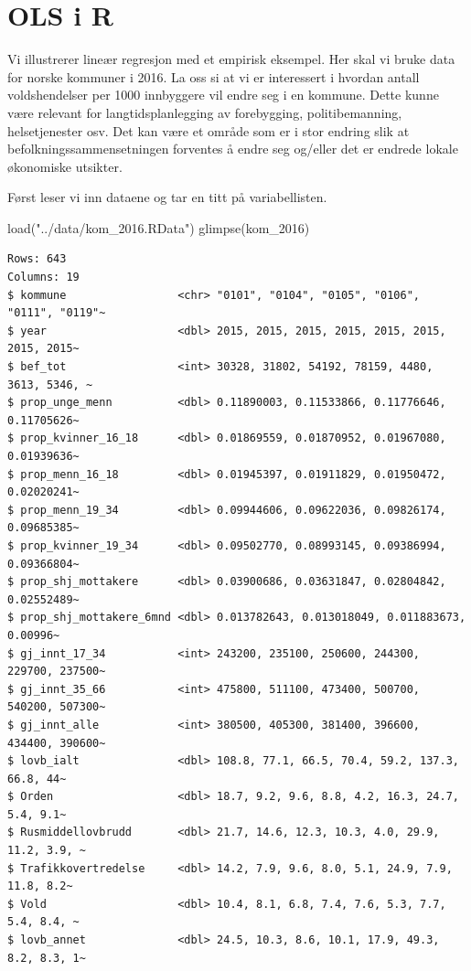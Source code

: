 \documentclass[
  letterpaper,
  DIV=11,
  numbers=noendperiod]{scrreprt}
\newenvironment{Shaded}{\begin{snugshade}}{\end{snugshade}}
\newcommand{\FunctionTok}[1]{\textcolor[rgb]{0.28,0.35,0.67}{#1}}
\newcommand{\NormalTok}[1]{\textcolor[rgb]{0.00,0.23,0.31}{#1}}
\newcommand{\StringTok}[1]{\textcolor[rgb]{0.13,0.47,0.30}{#1}}
\theoremstyle{definition}
\theoremstyle{remark}
\begin{document}
\hypertarget{ols-i-r}{%
\section{OLS i R}\label{ols-i-r}}

Vi illustrerer lineær regresjon med et empirisk eksempel. Her skal vi
bruke data for norske kommuner i 2016. La oss si at vi er interessert i
hvordan antall voldshendelser per 1000 innbyggere vil endre seg i en
kommune. Dette kunne være relevant for langtidsplanlegging av
forebygging, politibemanning, helsetjenester osv. Det kan være et område
som er i stor endring slik at befolkningssammensetningen forventes å
endre seg og/eller det er endrede lokale økonomiske utsikter.

Først leser vi inn dataene og tar en titt på variabellisten.

\begin{Shaded}
\begin{Highlighting}[]
\FunctionTok{load}\NormalTok{(}\StringTok{"../data/kom\_2016.RData"}\NormalTok{)}
\FunctionTok{glimpse}\NormalTok{(kom\_2016)}
\end{Highlighting}
\end{Shaded}

\begin{verbatim}
Rows: 643
Columns: 19
$ kommune                 <chr> "0101", "0104", "0105", "0106", "0111", "0119"~
$ year                    <dbl> 2015, 2015, 2015, 2015, 2015, 2015, 2015, 2015~
$ bef_tot                 <int> 30328, 31802, 54192, 78159, 4480, 3613, 5346, ~
$ prop_unge_menn          <dbl> 0.11890003, 0.11533866, 0.11776646, 0.11705626~
$ prop_kvinner_16_18      <dbl> 0.01869559, 0.01870952, 0.01967080, 0.01939636~
$ prop_menn_16_18         <dbl> 0.01945397, 0.01911829, 0.01950472, 0.02020241~
$ prop_menn_19_34         <dbl> 0.09944606, 0.09622036, 0.09826174, 0.09685385~
$ prop_kvinner_19_34      <dbl> 0.09502770, 0.08993145, 0.09386994, 0.09366804~
$ prop_shj_mottakere      <dbl> 0.03900686, 0.03631847, 0.02804842, 0.02552489~
$ prop_shj_mottakere_6mnd <dbl> 0.013782643, 0.013018049, 0.011883673, 0.00996~
$ gj_innt_17_34           <int> 243200, 235100, 250600, 244300, 229700, 237500~
$ gj_innt_35_66           <int> 475800, 511100, 473400, 500700, 540200, 507300~
$ gj_innt_alle            <int> 380500, 405300, 381400, 396600, 434400, 390600~
$ lovb_ialt               <dbl> 108.8, 77.1, 66.5, 70.4, 59.2, 137.3, 66.8, 44~
$ Orden                   <dbl> 18.7, 9.2, 9.6, 8.8, 4.2, 16.3, 24.7, 5.4, 9.1~
$ Rusmiddellovbrudd       <dbl> 21.7, 14.6, 12.3, 10.3, 4.0, 29.9, 11.2, 3.9, ~
$ Trafikkovertredelse     <dbl> 14.2, 7.9, 9.6, 8.0, 5.1, 24.9, 7.9, 11.8, 8.2~
$ Vold                    <dbl> 10.4, 8.1, 6.8, 7.4, 7.6, 5.3, 7.7, 5.4, 8.4, ~
$ lovb_annet              <dbl> 24.5, 10.3, 8.6, 10.1, 17.9, 49.3, 8.2, 8.3, 1~
\end{verbatim}
\end{document}

